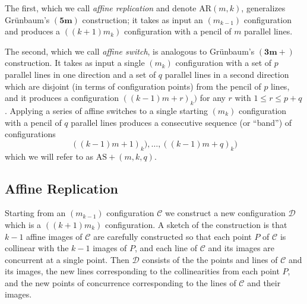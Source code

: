 \documentclass[reqno,12pt]{amsart}
\theoremstyle{plain}
\theoremstyle{definition}
\theoremstyle{remark}
\newcommand{\mc}[1]{\mathcal{#1}}
\begin{document}
\newcommand{\AR}{\mathrm{AR}}

The first, which we call \emph{affine replication} and denote $\AR(m, k)$, %
generalizes Gr\"unbaum's $\mathbf{(5m)}$ construction; 
it takes as input an $(m_{k-1})$ configuration and produces a $((k+1)m_{k})$ configuration with a pencil of $m$ parallel lines. 

\newcommand{\AS}{\mathrm{AS+}}

The second, which we call %
\emph{affine switch}, %
is analogous to Gr\"unbaum's $\mathbf{(3m+)}$ construction. 
It takes as input a single $(m_{k})$ configuration with a set of $p$ parallel lines in one direction and a set of $q$ parallel lines in 
a second direction which are disjoint (in terms of configuration points) from the pencil of $p$ lines, 
and it produces a configuration $((k-1)m+r)_{k})$ for any $r$ with $1 \leq r \leq p+q$. Applying a series of affine switches to a single 
starting $(m_{k})$ configuration with a pencil of $q$ parallel lines produces a consecutive sequence (or ``band'') of configurations 
\[((k-1)m+1)_{k}), \ldots, ((k-1)m+q)_{k})\]
which we will refer to as $\AS(m,k,q)$.

\subsection{Affine Replication%
} 

Starting from an $(m_{k-1})$ configuration $\mc{C}$ we construct a new configuration $\mc{D}$ which is a $((k+1)m_{k})$ configuration. 
A sketch of the construction is that $k-1$ affine images of $\mc{C}$ are carefully constructed so that each point $P$ of $\mc{C}$ is collinear 
with the $k-1$ images of $P$, and each line of $\mc{C}$ and its images are concurrent at a single point. Then $\mc{D}$ consists of the the 
points and lines of $\mc{C}$ and its images, the new lines corresponding to the collinearities from each point $P$, and the new points of 
concurrence corresponding to the lines of $\mc{C}$ and their images.
\end{document}
